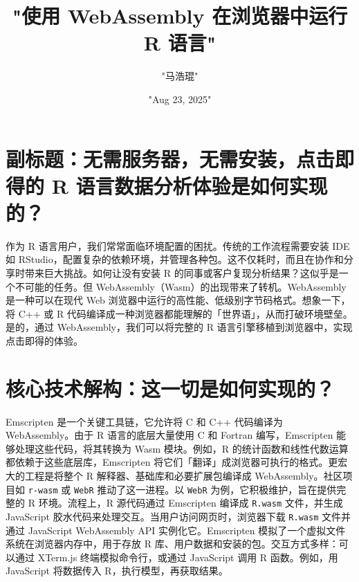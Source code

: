 \title{"使用 WebAssembly 在浏览器中运行 R 语言"}
\author{"马浩琨"}
\date{"Aug 23, 2025"}
\maketitle
\chapter{副标题：无需服务器，无需安装，点击即得的 R 语言数据分析体验是如何实现的？}
作为 R 语言用户，我们常常面临环境配置的困扰。传统的工作流程需要安装 IDE 如 RStudio，配置复杂的依赖环境，并管理各种包。这不仅耗时，而且在协作和分享时带来巨大挑战。如何让没有安装 R 的同事或客户复现分析结果？这似乎是一个不可能的任务。但 WebAssembly（Wasm）的出现带来了转机。WebAssembly 是一种可以在现代 Web 浏览器中运行的高性能、低级别字节码格式。想象一下，将 C++ 或 R 代码编译成一种浏览器都能理解的「世界语」，从而打破环境壁垒。是的，通过 WebAssembly，我们可以将完整的 R 语言引擎移植到浏览器中，实现点击即得的体验。\par
\chapter{核心技术解构：这一切是如何实现的？}
Emscripten 是一个关键工具链，它允许将 C 和 C++ 代码编译为 WebAssembly。由于 R 语言的底层大量使用 C 和 Fortran 编写，Emscripten 能够处理这些代码，将其转换为 Wasm 模块。例如，R 的统计函数和线性代数运算都依赖于这些底层库，Emscripten 将它们「翻译」成浏览器可执行的格式。更宏大的工程是将整个 R 解释器、基础库和必要扩展包编译成 WebAssembly。社区项目如 \texttt{r-wasm} 或 \texttt{WebR} 推动了这一进程。以 \texttt{WebR} 为例，它积极维护，旨在提供完整的 R 环境。流程上，R 源代码通过 Emscripten 编译成 \texttt{R.wasm} 文件，并生成 JavaScript 胶水代码来处理交互。当用户访问网页时，浏览器下载 \texttt{R.wasm} 文件并通过 JavaScript WebAssembly API 实例化它。Emscripten 模拟了一个虚拟文件系统在浏览器内存中，用于存放 R 库、用户数据和安装的包。交互方式多样：可以通过 XTerm.js 终端模拟命令行，或通过 JavaScript 调用 R 函数。例如，用 JavaScript 将数据传入 R，执行模型，再获取结果。\par
